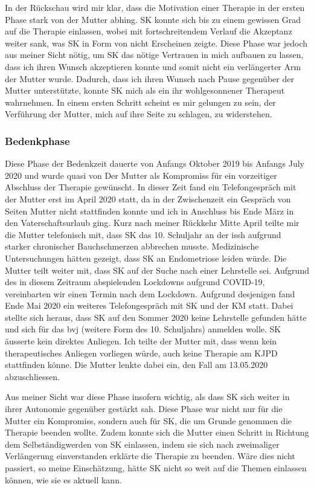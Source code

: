 In der Rückschau wird mir klar, dass die Motivation einer Therapie in der ersten Phase stark von der Mutter abhing. SK konnte sich bis zu einem gewissen Grad auf die Therapie einlassen, wobei mit fortschreitendem Verlauf die Akzeptanz weiter sank, was SK in Form von nicht Erscheinen zeigte. Diese Phase war jedoch aus meiner Sicht nötig, um SK das nötige Vertrauen in mich aufbauen zu lassen, dass ich ihren Wunsch akzeptieren konnte und somit nicht ein verlängerter Arm der Mutter wurde. Dadurch, dass ich ihren Wunsch nach Pause gegenüber der Mutter unterstützte, konnte SK mich als ein ihr wohlgesonnener Therapeut wahrnehmen. In einem ersten Schritt scheint es mir gelungen zu sein, der Verführung der Mutter, mich auf ihre Seite zu schlagen, zu widerstehen.  

\subsubsection{Bedenkphase}
Diese Phase der Bedenkzeit dauerte von Anfangs Oktober 2019 bis Anfangs July 2020 und wurde quasi von Der Mutter als Kompromiss für ein vorzeitiger Abschluss der Therapie gewünscht. In dieser Zeit fand ein Telefongespräch mit der Mutter erst im April 2020 statt, da in der Zwischenzeit ein Gespräch von Seiten Mutter nicht stattfinden konnte und ich in Anschluss bis Ende März in den Vaterschaftsurlaub ging. Kurz nach meiner Rückkehr Mitte April teilte mir die Mutter telefonisch mit, dass SK das 10. Schuljahr an der \ac{issh} aufgrund starker chronischer Bauchschmerzen abbrechen musste. Medizinische Untersuchungen hätten gezeigt, dass SK an Endometriose leiden würde. Die Mutter teilt weiter mit, dass SK auf der Suche nach einer Lehrstelle sei. Aufgrund des in diesem Zeitraum abspielenden Lockdowns aufgrund COVID-19, vereinbarten wir einen Termin nach dem Lockdown. Aufgrund desjenigen fand Ende Mai 2020 ein weiteres Telefongespräch mit SK und der KM statt. Dabei stellte sich heraus, dass SK auf den Sommer 2020 keine Lehrstelle gefunden hätte und sich für das \ac{bvj} (weitere Form des 10. Schuljahrs) anmelden wolle. SK äusserte kein direktes Anliegen. Ich teilte der Mutter mit, dass wenn kein therapeutisches Anliegen vorliegen würde, auch keine Therapie am KJPD stattfinden könne. Die Mutter lenkte dabei ein, den Fall am 13.05.2020 abzuschliessen.

Aus meiner Sicht war diese Phase insofern wichtig, als dass SK sich weiter in ihrer Autonomie gegenüber gestärkt sah. Diese Phase war nicht nur für die Mutter ein Kompromiss, sondern auch für SK, die um Grunde genommen die Therapie beenden wollte. Zudem konnte sich die Mutter einen Schritt in Richtung dem Selbständigwerden von SK einlassen, indem sie sich nach zweimaliger Verlängerung einverstanden erklärte die Therapie zu beenden. Wäre dies nicht passiert, so meine Einschätzung, hätte SK nicht so weit auf die Themen einlassen können, wie sie es aktuell kann. 

